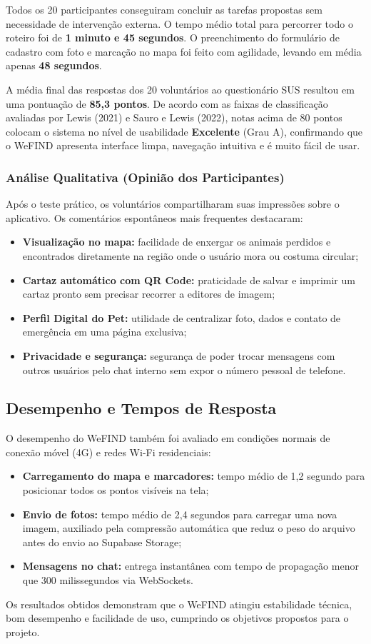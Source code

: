 Todos os 20 participantes conseguiram concluir as tarefas propostas sem necessidade de intervenção externa. O tempo médio total para percorrer todo o roteiro foi de \textbf{1 minuto e 45 segundos}. O preenchimento do formulário de cadastro com foto e marcação no mapa foi feito com agilidade, levando em média apenas \textbf{48 segundos}.

A média final das respostas dos 20 voluntários ao questionário SUS resultou em uma pontuação de \textbf{85,3 pontos}. De acordo com as faixas de classificação avaliadas por Lewis (2021) e Sauro e Lewis (2022), notas acima de 80 pontos colocam o sistema no nível de usabilidade \textbf{Excelente} (Grau A), confirmando que o WeFIND apresenta interface limpa, navegação intuitiva e é muito fácil de usar.

\subsubsection{Análise Qualitativa (Opinião dos Participantes)}

Após o teste prático, os voluntários compartilharam suas impressões sobre o aplicativo. Os comentários espontâneos mais frequentes destacaram:
\begin{itemize}
    \item \textbf{Visualização no mapa:} facilidade de enxergar os animais perdidos e encontrados diretamente na região onde o usuário mora ou costuma circular;
    \item \textbf{Cartaz automático com QR Code:} praticidade de salvar e imprimir um cartaz pronto sem precisar recorrer a editores de imagem;
    \item \textbf{Perfil Digital do Pet:} utilidade de centralizar foto, dados e contato de emergência em uma página exclusiva;
    \item \textbf{Privacidade e segurança:} segurança de poder trocar mensagens com outros usuários pelo chat interno sem expor o número pessoal de telefone.
\end{itemize}

\subsection{Desempenho e Tempos de Resposta}

O desempenho do WeFIND também foi avaliado em condições normais de conexão móvel (4G) e redes Wi-Fi residenciais:
\begin{itemize}
    \item \textbf{Carregamento do mapa e marcadores:} tempo médio de 1,2 segundo para posicionar todos os pontos visíveis na tela;
    \item \textbf{Envio de fotos:} tempo médio de 2,4 segundos para carregar uma nova imagem, auxiliado pela compressão automática que reduz o peso do arquivo antes do envio ao Supabase Storage;
    \item \textbf{Mensagens no chat:} entrega instantânea com tempo de propagação menor que 300 milissegundos via WebSockets.
\end{itemize}

Os resultados obtidos demonstram que o WeFIND atingiu estabilidade técnica, bom desempenho e facilidade de uso, cumprindo os objetivos propostos para o projeto.
\clearpage
